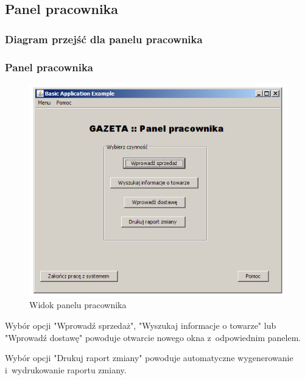 \subsection{Panel pracownika}
\subsubsection{Diagram przejść dla panelu pracownika}
\clearpage
\subsubsection{Panel pracownika}
\begin{figure}[h]
\includegraphics[width=1\textwidth]{gfx/pracownik.png}
\caption{Widok panelu pracownika}
\end{figure}
Wybór opcji "Wprowadź sprzedaż", "Wyszukaj informacje o towarze" lub "Wprowadź dostawę" powoduje otwarcie nowego okna z~odpowiednim panelem.

Wybór opcji "Drukuj raport zmiany" powoduje automatyczne wygenerowanie i~wydrukowanie raportu zmiany.
\clearpage
